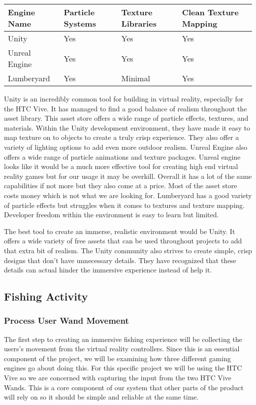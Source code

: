\documentclass[10pt,journal,compsoc,onecolumn, draftclsnofoot]{IEEEtran}
\begin{document}
\vspace{2mm}
\begin{table}[h!]
\centering
  \begin{tabu} to 1.0\textwidth { | X[l] || X[c] | X[c] | X[c] |  }
  \hline
  Engine Name & Particle Systems & Texture Libraries & Clean Texture Mapping\\
  \hline
  Unity  & Yes & Yes & Yes\\
  Unreal Engine & Yes & Yes & Yes\\
  Lumberyard & Yes & Minimal & Yes \\
  \hline
  \end{tabu}
\end{table}
\vspace{2mm}

Unity is an incredibly common tool for building in virtual reality, especially for the HTC Vive.
It has managed to find a good balance of realism throughout the asset library.
This asset store offers a wide range of particle effects, textures, and materials.
Within the Unity development environment, they have made it easy to map texture on to objects to create a truly crisp experience.
They also offer a variety of lighting options to add even more outdoor realism.
Unreal Engine also offers a wide range of particle animations and texture packages.
Unreal engine looks like it would be a much more effective tool for creating high end virtual reality games but for our usage it may be overkill.
Overall it has a lot of the same capabilities if not more but they also come at a price.
Most of the asset store costs money which is not what we are looking for.
Lumberyard has a good variety of particle effects but struggles when it comes to textures and texture mapping.
Developer freedom within the environment is easy to learn but limited.

The best tool to create an immerse, realistic environment would be Unity.
It offers a wide variety of free assets that can be used throughout projects to add that extra bit of realism.
The Unity community also strives to create simple, crisp designs that don’t have unnecessary details.
They have recognized that these details can actual hinder the immersive experience instead of help it.
\vspace{2mm
}

\subsection{Fishing Activity}
\subsubsection{Process User Wand Movement}
The first step to creating an immersive fishing experience will be collecting the users's movement from the virtual reality controllers.
Since this is an essential component of the project, we will be examining how three different gaming engines go about doing this.
For this specific project we will be using the HTC Vive so we are concerned with capturing the input from the two HTC Vive Wands.
This is a core component of our system that other parts of the product will rely on so it should be simple and reliable at the same time.
\end{document}

